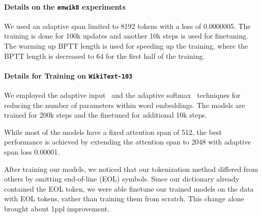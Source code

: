 \documentclass{article} \usepackage{iclr2021_conference}
\begin{document}
\paragraph{Details on the \texttt{enwik8} experiments}
We used an adaptive span limited to 8192 tokens with a loss of 0.0000005. The training is done for 100k updates and another 10k steps is used for finetuning.
The warming up BPTT length is used for speeding up the training, where the BPTT length is decreased to 64 for the first half of the training.

\paragraph{Details for Training on \texttt{WikiText-103}}
We employed the adaptive input~\cite{baevski2018adaptive} and the adaptive softmax~\cite{grave2017efficient} techniques for reducing the number of parameters within word embeddings.
The models are trained for 200k steps and the finetuned for additional 10k steps. 


While most of the models have a fixed attention span of 512, the best performance is achieved by extending the attention span to 2048 with adaptive span loss 0.00001.

After training our models, we noticed that our tokenization method differed from others by omitting end-of-line (EOL) symbols. Since our dictionary already contained the EOL token, we were able finetune our trained models on the data with EOL tokens, rather than training them from scratch. This change alone brought about 1ppl improvement.
 
\end{document}
